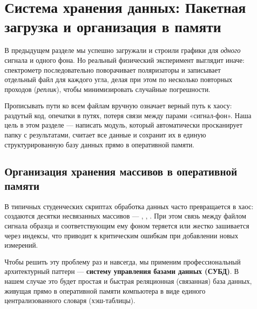 
\section{Система хранения данных: Пакетная загрузка и организация в памяти}\label{sec:database}

В предыдущем разделе мы успешно загружали и строили графики для \textit{одного} сигнала и одного фона. Но реальный физический эксперимент выглядит иначе: спектрометр последовательно поворачивает поляризаторы и записывает отдельный файл для каждого угла, делая при этом по несколько повторных проходов (\textit{реплик}), чтобы минимизировать случайные погрешности.

Прописывать пути ко всем файлам вручную означает верный путь к хаосу: раздутый код, опечатки в путях, потеря связи между парами «сигнал-фон». Наша цель в этом разделе --- написать модуль, который автоматически просканирует папку с результатами, считает все данные и сохранит их в единую структурированную базу данных прямо в оперативной памяти.

\subsection{Организация хранения массивов в оперативной памяти}\label{ssec:db_arch}

В типичных студенческих скриптах обработка данных часто превращается в хаос: создаются десятки несвязанных массивов --- , , . При этом связь между файлом сигнала образца и соответствующим ему фоном теряется или жестко зашивается через индексы, что приводит к критическим ошибкам при добавлении новых измерений.

Чтобы решить эту проблему раз и навсегда, мы применим профессиональный архитектурный паттерн --- \textbf{систему управления базами данных (СУБД)}. В нашем случае это будет простая и быстрая реляционная (связанная) база данных, живущая прямо в оперативной памяти компьютера в виде единого централизованного словаря  (хэш-таблицы).


